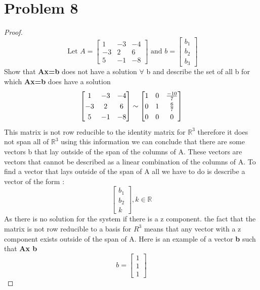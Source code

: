 \documentclass[12pt,a4paper]{article}
\newcommand{\R}{\mathbb{R}}
\begin{document}
\section*{Problem 8}
\begin{proof}
    \[
      \text{ Let } A =\begin{bmatrix}
        1 & -3 & -4 \\
        -3 & 2 & 6 \\
        5 & -1 & -8
    \end{bmatrix}
    \text{ and } b= \begin{bmatrix}
      b_1\\b_2\\b_3
  \end{bmatrix}
    \]
    Show that \textbf{Ax=b} does not have a solution $\forall$ b and describe the set of all b for which \textbf{Ax=b} does have a solution
    \[
    \begin{bmatrix}
      1 & -3 & -4 \\
      -3 & 2 & 6 \\
      5 & -1 & -8
  \end{bmatrix} \sim
  \renewcommand\arraystretch{1.25}
  \begin{bmatrix}
    1 & 0 & \frac{-10}{7} \\
    0 & 1 & \frac{6}{7} \\
    0 & 0 & 0
  \end{bmatrix}
    \]
    This matrix is not row reducible to the identity matrix for $\R^3$ therefore it does not span all of $\R^3$ using this information we can conclude that there are some vectors b that lay outside of the span of the columns of A. These vectors are vectors that cannot be described as a linear combination of the columns of A. To find a vector that lays outside of the span of A all we have to do is describe a vector of the form :
    \[
      \begin{bmatrix}
        b_1\\b_2\\k
      \end{bmatrix},
      k \in \mathbb{R}
    \]
    As there is no solution for the system if there is a z component. the fact that the matrix is not row reducible to a basis for $R^3$ means that any vector with a z component exists outside of the span of A. Here is an example of a vector \textbf{b} such that \textbf{Ax \neq b}\\
    \[
      b=\begin{bmatrix}
        1\\1\\1

\end{bmatrix}\]
\end{proof}
\end{document}
